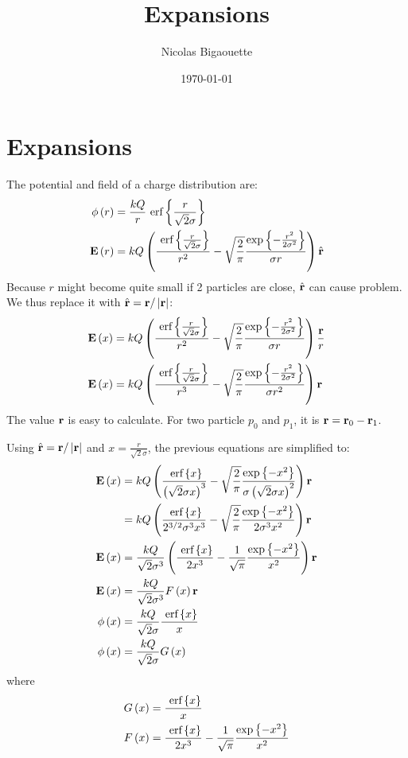 \documentclass[12pt,letterpaper]{article}
\title{Expansions}
\date{\today}
\author{Nicolas Bigaouette}
\begin{document}
\maketitle



\section{Expansions}
The potential and field of a charge distribution are:
\begin{align}
\phi\left( r \right) & = \frac{k Q}{r} ~\textrm{erf} \left\{\frac{r}{\sqrt{2} \sigma}\right\}
\\
\textbf{E}\left( r \right)  & = k Q \left( 
    \frac{ ~\textrm{erf} \left\{\frac{r}{\sqrt{2} \sigma}\right\} }{r^2}
    - \sqrt{ \frac{2}{\pi} } \frac{ \exp{ \left\{  -\frac{r^2}{2 \sigma^2}  \right\}} }{\sigma r}
 \right) \hat{\textbf{r}}
\end{align}
Because $r$ might become quite small if 2 particles are close, $\hat{\textbf{r}}$ can cause problem.
We thus replace it with $\hat{\textbf{r}} = \textbf{r} / \left| \textbf{r} \right|$:
\begin{align}
\textbf{E}\left( x \right)  & = k Q \left( 
    \frac{ ~\textrm{erf} \left\{\frac{r}{\sqrt{2} \sigma}\right\} }{r^2}
    - \sqrt{ \frac{2}{\pi} } \frac{ \exp{ \left\{  -\frac{r^2}{2 \sigma^2}  \right\}} }{\sigma r}
 \right) \frac{\textbf{r}}{r}
\\
\textbf{E}\left( x \right)  & = k Q \left( 
    \frac{ ~\textrm{erf} \left\{\frac{r}{\sqrt{2} \sigma}\right\} }{r^3}
    - \sqrt{ \frac{2}{\pi} } \frac{ \exp{ \left\{  -\frac{r^2}{2 \sigma^2}  \right\}} }{\sigma r^2}
 \right) \textbf{r}
\end{align}
The value $\textbf{r}$ is easy to calculate. For two particle $p_0$ and $p_1$, it is $\textbf{r} = \textbf{r}_0 - \textbf{r}_1$.

Using $\hat{\textbf{r}} = \textbf{r} / \left| \textbf{r} \right|$ and $x = \frac{r}{\sqrt{2} \sigma}$, the previous equations
are simplified to:
\begin{align}
\textbf{E}\left( x \right)
& = k Q \left( 
    \frac{ ~\textrm{erf} \left\{x\right\} }{\left( \sqrt{2} \sigma x \right)^3}
    - \sqrt{ \frac{2}{\pi} } \frac{ \exp{ \left\{ -x^2 \right\}} }{\sigma \left( \sqrt{2} \sigma x \right)^2}
 \right) \textbf{r}
\nonumber \\
& = k Q \left( 
    \frac{ ~\textrm{erf} \left\{x\right\} }{2^{3/2} \sigma^3 x^3}
    - \sqrt{ \frac{2}{\pi} } \frac{ \exp{ \left\{ -x^2 \right\}} }{2 \sigma^3 x^2}
 \right) \textbf{r}
\nonumber \\
\textbf{E}\left( x \right)
& = \frac{k Q}{\sqrt{2} \sigma^3} \left( 
    \frac{ ~\textrm{erf} \left\{x\right\} }{2 x^3}
    - \frac{1}{\sqrt{\pi}} \frac{ \exp{ \left\{ -x^2 \right\}} }{x^2}
 \right) \textbf{r}
\nonumber \\
\textbf{E}\left( x \right)
& = \frac{k Q}{\sqrt{2} \sigma^3} F\left( x \right) \textbf{r}
\\
\phi\left( x \right) & = \frac{k Q}{\sqrt{2} \sigma} \frac{~\textrm{erf} \left\{x\right\}}{x}
\\
\phi\left( x \right) & = \frac{k Q}{\sqrt{2} \sigma} G\left( x \right)
\end{align}
where
\begin{align}
G\left( x \right) & = \frac{~\textrm{erf} \left\{x\right\}}{x} \\
F\left( x \right) & = \frac{ ~\textrm{erf} \left\{x\right\} }{2 x^3} - \frac{1}{\sqrt{\pi}} \frac{ \exp{ \left\{ -x^2 \right\}} }{x^2}
\end{align}
\end{document}

